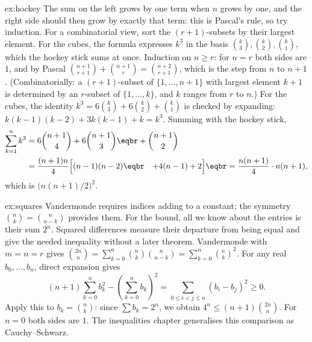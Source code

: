 \begin{solution}{ex:hockey}
\idea The sum on the left grows by one term when $n$ grows by one, and the right side should then grow by exactly that term: this is Pascal's rule, so try induction. For a combinatorial view, sort the $(r+1)$-subsets by their largest element. For the cubes, the formula expresses $k^3$ in the basis $\binom k3,\binom k2,\binom k1$, which the hockey stick sums at once.
\writeup Induction on $n\ge r$: for $n=r$ both sides are $1$, and by Pascal
$\binom{n+1}{r+1}+\binom{n+1}{r}=\binom{n+2}{r+1}$, which is the step from $n$ to $n+1$.
(Combinatorially: a $(r+1)$-subset of $\{1,\dots,n+1\}$ with largest element $k+1$ is determined by an
$r$-subset of $\{1,\dots,k\}$, and $k$ ranges from $r$ to $n$.)
For the cubes, the identity $k^3=6\binom k3+6\binom k2+\binom k1$ is checked by expanding:
$k(k-1)(k-2)+3k(k-1)+k=k^3$. Summing with the hockey stick,
\[
\begin{aligned}
\sum_{k=1}^nk^3&=6\binom{n+1}4+6\binom{n+1}3\eqbr+\binom{n+1}2\\
&=\frac{(n+1)n}{4}\Bigl[(n-1)(n-2)\Bigr.\eqbr\Bigl.\quad+4(n-1)+2\Bigr]\eqbr=\frac{n(n+1)}4\cdot n(n+1),
\end{aligned}
\]
which is $\bigl(n(n+1)/2\bigr)^2$.
\end{solution}

\begin{solution}{ex:squares}
\idea Vandermonde requires indices adding to a constant; the symmetry $\binom nk=\binom n{n-k}$ provides them. For the bound, all we know about the entries is their sum $2^n$. Squared differences measure their departure from being equal and give the needed inequality without a later theorem.
\writeup Vandermonde with $m=n=r$ gives $\binom{2n}n=\sum_{k=0}^n\binom nk\binom n{n-k}=\sum_{k=0}^n\binom nk^2$. For any real $b_0,\dots,b_n$, direct expansion gives
\[
(n+1)\sum_{k=0}^n b_k^2-\left(\sum_{k=0}^n b_k\right)^2
=\sum_{0\le i<j\le n}(b_i-b_j)^2\ge0.
\]
Apply this to $b_k=\binom nk$: since $\sum b_k=2^n$, we obtain $4^n\le(n+1)\binom{2n}n$. For $n=0$ both sides are $1$. The inequalities chapter generalises this comparison as Cauchy--Schwarz.
\end{solution}

